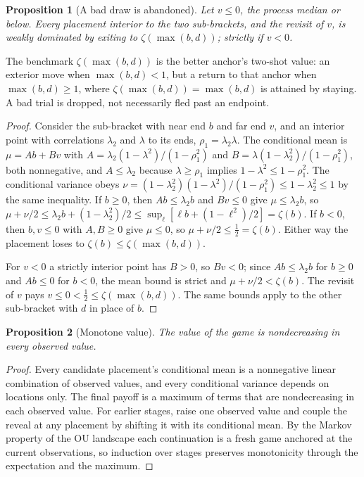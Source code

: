 \documentclass[11pt]{article}
\theoremstyle{itheads}
\newtheorem{proposition}{Proposition}
\begin{document}
\begin{proposition}[A bad draw is abandoned]\label{prop:abandon}
Let $v \le 0$, the process median or below. Every placement interior
to the two sub-brackets, and the revisit of $v$, is weakly dominated
by exiting to $\zeta(\max(b,d))$; strictly if $v < 0$.
\end{proposition}

\noindent The benchmark $\zeta(\max(b,d))$ is the better anchor's
two-shot value: an exterior move when $\max(b,d)<1$, but a return to
that anchor when $\max(b,d)\ge 1$, where $\zeta(\max(b,d))=\max(b,d)$
is attained by staying. A bad trial is dropped, not necessarily fled
past an endpoint.

\begin{proof}
Consider the sub-bracket with near end $b$ and far end $v$, and an
interior point with correlations $\lambda_2$ and $\lambda$ to its
ends, $\rho_1 = \lambda_2\lambda$. The conditional mean is
$\mu = Ab + Bv$ with
$A = \lambda_2(1-\lambda^{2})/(1-\rho_1^{2})$ and
$B = \lambda(1-\lambda_2^{2})/(1-\rho_1^{2})$, both nonnegative, and
$A \le \lambda_2$ because $\lambda \ge \rho_1$ implies
$1-\lambda^{2} \le 1-\rho_1^{2}$. The conditional variance obeys
$\nu = (1-\lambda_2^{2})(1-\lambda^{2})/(1-\rho_1^{2})
\le 1-\lambda_2^{2} \le 1$ by the same inequality. If $b \ge 0$,
then $Ab \le \lambda_2 b$ and $Bv \le 0$ give $\mu \le \lambda_2 b$,
so $\mu + \nu/2 \le \lambda_2 b + (1-\lambda_2^{2})/2 \le
\sup_{\ell}[\ell b + (1-\ell^{2})/2] = \zeta(b)$. If $b < 0$, then
$b, v \le 0$ with $A, B \ge 0$ give $\mu \le 0$, so
$\mu + \nu/2 \le \tfrac12 = \zeta(b)$. Either way the placement
loses to $\zeta(b) \le \zeta(\max(b,d))$.

For $v < 0$ a strictly interior point has $B > 0$, so $Bv < 0$; since
$Ab \le \lambda_2 b$ for $b\ge0$ and $Ab \le 0$ for $b<0$, the mean
bound is strict and $\mu + \nu/2 < \zeta(b)$. The revisit of
$v$ pays $v \le 0 < \tfrac12 \le \zeta(\max(b,d))$. The same bounds
apply to the other sub-bracket with $d$ in place of $b$.
\end{proof}

\begin{proposition}[Monotone value]\label{prop:monotone}
The value of the game is nondecreasing in every observed value.
\end{proposition}

\begin{proof}
Every candidate placement's conditional mean is a nonnegative linear
combination of observed values, and every conditional variance
depends on locations only. The final payoff is a maximum of terms
that are nondecreasing in each observed value. For earlier stages,
raise one observed value and couple the reveal at any placement by
shifting it with its conditional mean. By the Markov property of the
OU landscape each continuation is a fresh game anchored at the
current observations, so induction over stages preserves monotonicity
through the expectation and the maximum.
\end{proof}
\end{document}
